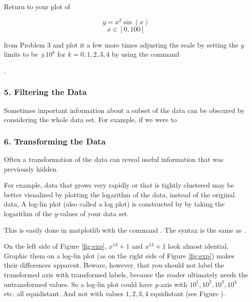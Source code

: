 \begin{problem}
Return to your plot of 

$$y = x^2\sin(x)$$ $$x\in[0,100]$$

from Problem 3 and plot it a few more times adjusting the scale by setting the $y$ limits to be $\pm10^{k}$ for $k = 0,1,2,3,4$ by using the command 

. 
\end{problem}



\subsubsection*{5. Filtering the Data}
Sometimes important information about a subset of the data can be obscured by considering the whole data set. For example, if we were to 

\subsubsection*{6. Transforming the Data}

Often a transformation of the data can reveal useful information that was previously hidden.

For example, data that grows very rapidly or that is tightly clustered may be better visualized by plotting the logarithm of the data, instead of the original data, A log-lin plot (also called a log plot) is constructed by by taking the logarithm of the $y$-values of your data set. 

This is easily done in matplotlib with the command .  The syntax is the same as .

On the left side of Figure \ref{fig:exp}, $x^{14}+1$ and $x^{13}+1$ look almost idential. Graphic them on a log-lin plot (as on the right side of Figure \ref{fig:exp}) makes their differences apparent.  Beware, however, that you should not label the transformed axis with transformed labels, because the reader ultimately needs the untransformed values.  So a log-lin plot could have $y$-axis with $10^{1},10^{2},10^{3},10^{4}$ etc.  all equidistant.  And not with values $1,2,3,4$ equidistant (see Figure ).

